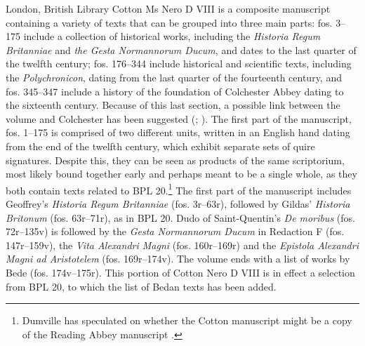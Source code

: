 \begin{paper}
London, British Library Cotton Ms Nero D VIII is a composite manuscript
containing a variety of texts that can be grouped into three main parts:
fos. 3--175 include a collection of historical works, including the
\emph{Historia Regum Britanniae} and \emph{the Gesta Normannorum Ducum},
and dates to the last quarter of the twelfth century; fos. 176--344
include historical and scientific texts, including the
\emph{Polychronicon}, dating from the last quarter of the fourteenth
century, and fos. 345--347 include a history of the foundation of
Colchester Abbey dating to the sixteenth century. Because of this last
section, a possible link between the volume and Colchester has been
suggested (\cite[xcvi]{van_houts_gesta_1992}; \cite[149--152]{crick_historia_1989}). The first part of
the manuscript, fos. 1--175 is comprised of two different units, written
in an English hand dating from the end of the twelfth century, which
exhibit separate sets of quire signatures. Despite this, they can be
seen as products of the same scriptorium, most likely bound together
early and perhaps meant to be a single whole, as they both contain texts
related to BPL 20.\footnote{Dumville has speculated on whether the
  Cotton manuscript might be a copy of the Reading Abbey manuscript 
  \citep[4]{dumville_early_1985}.} The first part of the manuscript includes
Geoffrey's \emph{Historia Regum Britanniae} (fos. 3r--63r), followed by
Gildas' \emph{Historia Britonum} (fos. 63r--71r), as in BPL 20. Dudo
of Saint-Quentin's \emph{De moribus} (fos. 72r--135v) is followed by the
\emph{Gesta Normannorum Ducum} in Redaction F (fos. 147r--159v), the
\emph{Vita Alexandri Magni} (fos. 160r--169r) and the \emph{Epistola
Alexandri Magni ad Aristotelem} (fos. 169r--174v). The volume ends with a
list of works by Bede (fos. 174v--175r). This portion of Cotton Nero D
VIII is in effect a selection from BPL 20, to which the list of Bedan
texts has been added.


\end{paper}
